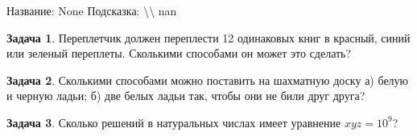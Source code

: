\documentclass[a4paper,11pt]{article}%
\theoremstyle{definition}%
\newtheorem{Ex}{\hspace{-25pt}\fbox{\phantom{123}} Задача}%
\begin{document}
Название: None%
Подсказка: \textbackslash{}\textbackslash{}%
nan%
\fi%
%
\begin{Ex}%
Переплетчик должен переплести 12 одинаковых книг в красный, синий или
зеленый переплеты. Сколькими способами он может это сделать?%
%
\end{Ex}%
%
\iffalse%
Автор: Дмитрий Трущин%
Дата: 01.10.2013%
Название: None%
Подсказка: \textbackslash{}\textbackslash{}%
nan%
\fi%
%
\begin{Ex}%
Сколькими способами можно поставить на шахматную доску а) белую и
черную ладьи; б) две белых ладьи так, чтобы они не били друг друга?%
%
\end{Ex}%
%
\iffalse%
Автор: 25 школа%
Дата: 01.11.2012%
Название: None%
Подсказка: \textbackslash{}\textbackslash{}%
nan%
\fi%
%
\begin{Ex}%
Сколько решений в натуральных числах имеет уравнение $x y z=10^{9}$?%
%
\end{Ex}%
%
\iffalse%
Автор: Дмитрий Трущин%
Дата: 01.10.2013%
Название: None%
Подсказка: \textbackslash{}\textbackslash{}%
nan%
\fi%
%
\end{document}
